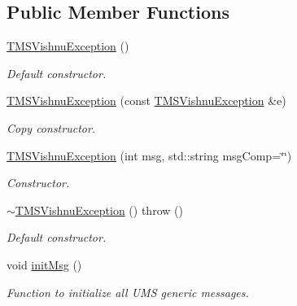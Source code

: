 \subsection*{Public Member Functions}
\begin{DoxyCompactItemize}
\item 
\hypertarget{classTMSVishnuException_afc045386530c82cbd14d7499bb346209}{
\hyperlink{classTMSVishnuException_afc045386530c82cbd14d7499bb346209}{TMSVishnuException} ()}
\label{classTMSVishnuException_afc045386530c82cbd14d7499bb346209}

\begin{DoxyCompactList}\small\item\em Default constructor. \item\end{DoxyCompactList}\item 
\hyperlink{classTMSVishnuException_a34e34f5815a8f12c5a42d07260f6f012}{TMSVishnuException} (const \hyperlink{classTMSVishnuException}{TMSVishnuException} \&e)
\begin{DoxyCompactList}\small\item\em Copy constructor. \item\end{DoxyCompactList}\item 
\hyperlink{classTMSVishnuException_a28396b88bf65fc54fb2eae5a30b3ad8a}{TMSVishnuException} (int msg, std::string msgComp=\char`\"{}\char`\"{})
\begin{DoxyCompactList}\small\item\em Constructor. \item\end{DoxyCompactList}\item 
\hypertarget{classTMSVishnuException_a2357555574bd5b081413b8ceea83e627}{
\hyperlink{classTMSVishnuException_a2357555574bd5b081413b8ceea83e627}{$\sim$TMSVishnuException} ()  throw ()}
\label{classTMSVishnuException_a2357555574bd5b081413b8ceea83e627}

\begin{DoxyCompactList}\small\item\em Default constructor. \item\end{DoxyCompactList}\item 
\hypertarget{classTMSVishnuException_acc49ac2fbad4757cefca21a16c1bb658}{
void \hyperlink{classTMSVishnuException_acc49ac2fbad4757cefca21a16c1bb658}{initMsg} ()}
\label{classTMSVishnuException_acc49ac2fbad4757cefca21a16c1bb658}

\begin{DoxyCompactList}\small\item\em Function to initialize all UMS generic messages. \item\end{DoxyCompactList}\end{DoxyCompactItemize}


